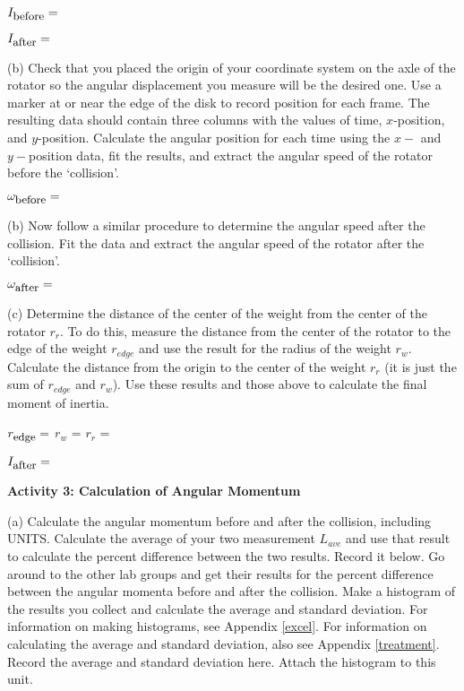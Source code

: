 \( I_{\mbox{\small before}}= \) 
\vspace{5mm}

\( I_{\mbox{\small after}} =\)  
\vspace{5mm}

(b) Check that you placed the origin of your coordinate system on the axle of the
rotator so the angular displacement you measure will be the desired one. 
Use a marker at or near the edge of the disk to record position for each frame. 
The resulting data should contain three columns with the values of time, $x$-position, and $y$-position.
Calculate the angular position for each time using the $x-$ and $y-$position data, fit the results,
and extract the angular speed of the rotator before the `collision'.

\( \omega _{\mbox{\small before}}=\)

\vspace{5mm}

(b) Now follow a similar procedure to determine the angular speed after the collision.
Fit the data and extract the angular speed of the rotator after the `collision'.

\( \omega _{\mbox{\small after}}=\)

\vspace{5mm}

(c) Determine the distance of the center of the weight from the center of the rotator \( r_{r} \). 
To do this, measure the distance from the center
of the rotator to the edge of the weight \( r_{edge} \) and use the result for
the radius of the weight \( r_{w} \). 
Calculate the distance from the origin to the center of the weight \( r_{r} \) (it is just the 
sum of \( r_{edge} \) and \( r_{w} \)). 
Use these results and those above to calculate the final moment of inertia.
\vspace{5mm}

\( r_{\mbox{\small edge}}  =\) \hfill{}\( r_{w} \) = \hfill{}\( r_{r} \) =\hfill{}
\vspace{5mm}

\( I_{\mbox{\small after}} =\)  
\vspace{5mm}

\textbf{Activity  3: Calculation of Angular Momentum}

(a) Calculate the angular momentum before and after the collision, including UNITS. 
Calculate the average of your two measurement $L_{ave}$ and use that result to
calculate the percent difference between the two results. Record it below. 
Go around to the other lab groups and get their results for the percent difference between 
the angular momenta before and after the collision.
Make a histogram of the results you collect and calculate the average and standard deviation.
For information on making histograms, see Appendix \ref{excel}. For information on calculating the average and
standard deviation, also see  Appendix \ref{treatment}. Record the average and standard deviation here.
Attach the histogram to this unit.
\vspace{5mm}

